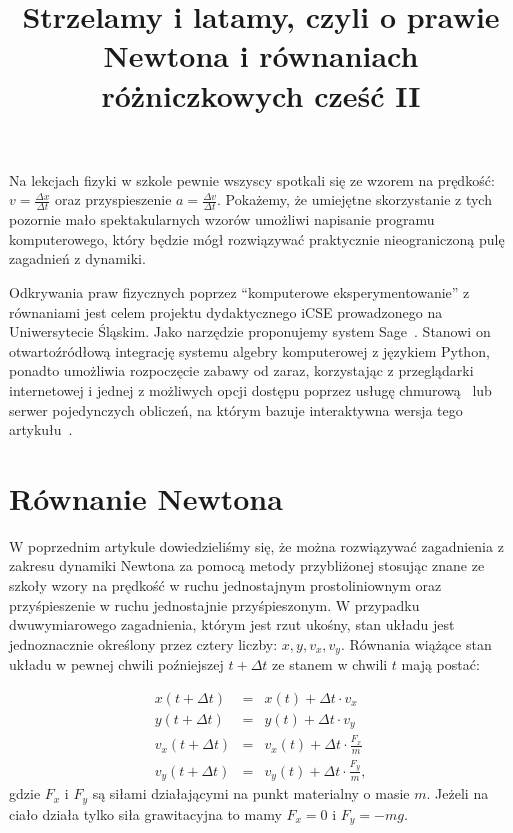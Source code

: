 \documentclass[10pt,twocolumn]{article}
\title{Strzelamy i latamy, czyli o prawie Newtona i równaniach różniczkowych cześć II}
\begin{document}
\maketitle
\lstset{language=Python}

Na lekcjach fizyki w szkole pewnie wszyscy spotkali się ze wzorem na
prędkość: $v=\frac{\Delta x}{\Delta t}$ oraz przyspieszenie
$a=\frac{\Delta v}{\Delta t}$. Pokażemy, że umiejętne skorzystanie z
tych pozornie mało spektakularnych wzorów umożliwi napisanie programu
komputerowego, który będzie mógł rozwiązywać praktycznie
nieograniczoną pulę zagadnień z dynamiki.

Odkrywania praw fizycznych poprzez ``komputerowe eksperymentowanie'' z
równaniami jest celem projektu dydaktycznego iCSE prowadzonego na
Uniwersytecie Śląskim. Jako narzędzie proponujemy system
Sage\ \cite{sagemath}. Stanowi on otwartoźródłową integrację systemu
algebry komputerowej z językiem Python, ponadto umożliwia rozpoczęcie
zabawy od zaraz, korzystając z przeglądarki internetowej i jednej z
możliwych opcji dostępu poprzez usługę chmurową\ \cite{cloud} lub
serwer pojedynczych obliczeń, na którym bazuje interaktywna wersja
tego artykułu\ \cite{web}.



\section{Równanie Newtona}

W poprzednim artykule dowiedzieliśmy się, że można rozwiązywać
zagadnienia z zakresu dynamiki Newtona za pomocą metody przybliżonej
stosując znane ze szkoły wzory na prędkość w ruchu jednostajnym
prostoliniownym oraz przyśpieszenie w ruchu jednostajnie
przyśpieszonym. W przypadku dwuwymiarowego zagadnienia, którym jest
rzut ukośny, stan układu jest jednoznacznie określony przez cztery
liczby: $x,y,v_x,v_y$. Równania wiążące stan układu w pewnej chwili
poźniejszej $t+\Delta t$ ze stanem w chwili $t$ mają postać:

\begin{eqnarray}
x(t+\Delta t)&=& x(t)+ \Delta t \cdot v_x \\ \nonumber
y(t+\Delta t)&=& y(t)+ \Delta t \cdot v_y \\ \nonumber
v_x(t+\Delta t) &=&v_x(t) + \Delta t\cdot  \frac{F_x}{m}\\ \nonumber
v_y(t+\Delta t) &=&v_y(t) + \Delta t\cdot  \frac{F_y}{m},
\label{eq:euler4} 
\end{eqnarray}
gdzie $F_x$ i $F_y$ są siłami działającymi na punkt materialny o masie
$m$. Jeżeli na ciało działa tylko siła grawitacyjna to mamy $F_x=0$ i
$F_y=-mg$.
\end{document}
